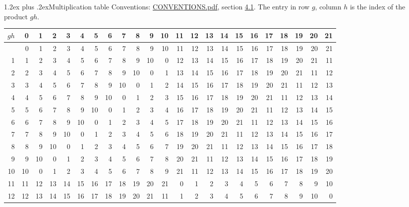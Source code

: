 \documentclass[10pt,a4paper]{article}
\makeatletter
\renewcommand\section{\@startsection{section}{1}{\z@}{-3ex plus -1ex minus -.2ex}%
  {1.2ex plus .2ex}{\normalfont\large\sffamily\bfseries\color{parttitle}}}
\numberwithin{equation}{section}
\makeatother
\begin{document}
\section{Multiplication table}\label{s:multiplication}
Conventions: \href{../../CONVENTIONS.pdf}{CONVENTIONS.pdf}, section \href{../../CONVENTIONS.pdf\#conv.4.1}{4.1}.
The entry in row $g$, column $h$ is the index of the product $gh$.
{\normalsize\setlength{\tabcolsep}{0.1em}\setlength{\LTleft}{-8pt plus 1fill}\setlength{\LTright}{-8pt plus 1fill}\begin{longtable}{@{}r|rrrrrrrrrrrrrrrrrrrrrr@{}}\toprule
$gh$ & 0 & 1 & 2 & 3 & 4 & 5 & 6 & 7 & 8 & 9 & 10 & 11 & 12 & 13 & 14 & 15 & 16 & 17 & 18 & 19 & 20 & 21\\\midrule\endhead
\bottomrule\endfoot\endlastfoot
0 & 0 & 1 & 2 & 3 & 4 & 5 & 6 & 7 & 8 & 9 & 10 & 11 & 12 & 13 & 14 & 15 & 16 & 17 & 18 & 19 & 20 & 21\\*
1 & 1 & 2 & 3 & 4 & 5 & 6 & 7 & 8 & 9 & 10 & 0 & 12 & 13 & 14 & 15 & 16 & 17 & 18 & 19 & 20 & 21 & 11\\
2 & 2 & 3 & 4 & 5 & 6 & 7 & 8 & 9 & 10 & 0 & 1 & 13 & 14 & 15 & 16 & 17 & 18 & 19 & 20 & 21 & 11 & 12\\
3 & 3 & 4 & 5 & 6 & 7 & 8 & 9 & 10 & 0 & 1 & 2 & 14 & 15 & 16 & 17 & 18 & 19 & 20 & 21 & 11 & 12 & 13\\
4 & 4 & 5 & 6 & 7 & 8 & 9 & 10 & 0 & 1 & 2 & 3 & 15 & 16 & 17 & 18 & 19 & 20 & 21 & 11 & 12 & 13 & 14\\
5 & 5 & 6 & 7 & 8 & 9 & 10 & 0 & 1 & 2 & 3 & 4 & 16 & 17 & 18 & 19 & 20 & 21 & 11 & 12 & 13 & 14 & 15\\
6 & 6 & 7 & 8 & 9 & 10 & 0 & 1 & 2 & 3 & 4 & 5 & 17 & 18 & 19 & 20 & 21 & 11 & 12 & 13 & 14 & 15 & 16\\
7 & 7 & 8 & 9 & 10 & 0 & 1 & 2 & 3 & 4 & 5 & 6 & 18 & 19 & 20 & 21 & 11 & 12 & 13 & 14 & 15 & 16 & 17\\
8 & 8 & 9 & 10 & 0 & 1 & 2 & 3 & 4 & 5 & 6 & 7 & 19 & 20 & 21 & 11 & 12 & 13 & 14 & 15 & 16 & 17 & 18\\
9 & 9 & 10 & 0 & 1 & 2 & 3 & 4 & 5 & 6 & 7 & 8 & 20 & 21 & 11 & 12 & 13 & 14 & 15 & 16 & 17 & 18 & 19\\
10 & 10 & 0 & 1 & 2 & 3 & 4 & 5 & 6 & 7 & 8 & 9 & 21 & 11 & 12 & 13 & 14 & 15 & 16 & 17 & 18 & 19 & 20\\
11 & 11 & 12 & 13 & 14 & 15 & 16 & 17 & 18 & 19 & 20 & 21 & 0 & 1 & 2 & 3 & 4 & 5 & 6 & 7 & 8 & 9 & 10\\
12 & 12 & 13 & 14 & 15 & 16 & 17 & 18 & 19 & 20 & 21 & 11 & 1 & 2 & 3 & 4 & 5 & 6 & 7 & 8 & 9 & 10 & 0\\

\end{longtable}}
\end{document}
